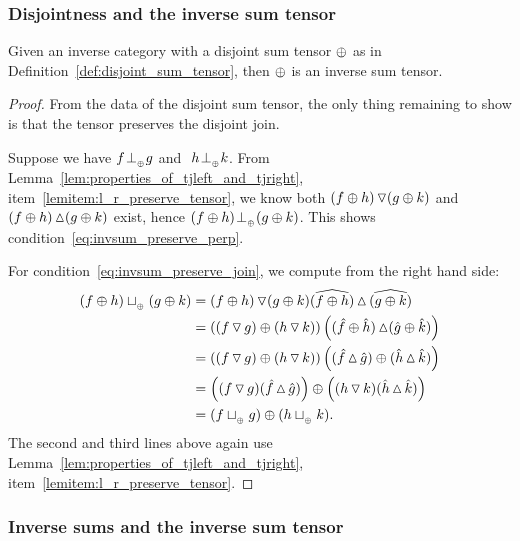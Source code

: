 \subsubsection{Disjointness and the inverse sum tensor} %
\label{ssub:disjointness_and_the_inverse_sum_tensor}
\begin{lemma}\label{lem:a_disjoint_sum_tensor_is_an_inverse_sum_tensor}
  Given an inverse category \X with a disjoint sum tensor $\oplus$ as in
  Definition~\ref{def:disjoint_sum_tensor}, then $\oplus$ is an inverse sum tensor.
\end{lemma}
\begin{proof}
  From the data of the disjoint sum tensor, the only thing remaining to show is that the tensor
  preserves the disjoint join.

  Suppose we have $f {}_{{}_{}}{\perp_{{}_{\oplus}}} g$ and $\ h {}_{{}_{}}{\perp_{{}_{\oplus}}} k$.
  From Lemma~\ref{lem:properties_of_tjleft_and_tjright}, item~\ref{lemitem:l_r_preserve_tensor}, we
  know both $(f\oplus h)\operatorname{\triangledown}(g\oplus k)$ and $(f\oplus h)\operatorname{\vartriangle}(g\oplus k)$ exist, hence $(f\oplus h){}_{{}_{}}{\perp_{{}_{\oplus}}}(g\oplus k)$.
  This shows condition~\eqref{eq:invsum_preserve_perp}.

  For condition~\eqref{eq:invsum_preserve_join}, we compute from the right hand side:
  \begin{align*}
    (f\oplus h)\sqcup_{{_{\oplus}}}(g\oplus k) &= (f\oplus h)\operatorname{\triangledown} (g\oplus k) \widehat{(f\oplus h)}\operatorname{\vartriangle} \widehat{(g\oplus k)}\\
    &= \left( (f\operatorname{\triangledown} g)\oplus (h \operatorname{\triangledown} k) \right)
       \left( (\hat{f}\oplus\hat{h}) \operatorname{\vartriangle} (\hat{g}\oplus\hat{k}) \right) \\
    &= \left( (f\operatorname{\triangledown} g)\oplus (h \operatorname{\triangledown} k) \right)
       \left( (\hat{f}\operatorname{\vartriangle} \hat{g}) \oplus (\hat{h}\operatorname{\vartriangle}\hat{k}) \right) \\
    &= \left( (f\operatorname{\triangledown} g)(\hat{f}\operatorname{\vartriangle} \hat{g})\right) \oplus
       \left((h \operatorname{\triangledown} k) (\hat{h}\operatorname{\vartriangle}\hat{k}) \right) \\
    &=  (f\sqcup_{{_{\oplus}}} g)\oplus(h \sqcup_{{_{\oplus}}} k).
  \end{align*}
  The second and third lines above again use Lemma~\ref{lem:properties_of_tjleft_and_tjright},
  item~\ref{lemitem:l_r_preserve_tensor}.

\end{proof}

\subsubsection{Inverse sums and the inverse sum tensor} %
\label{ssub:inverse_sums_and_the_inverse_sum_tensor}

